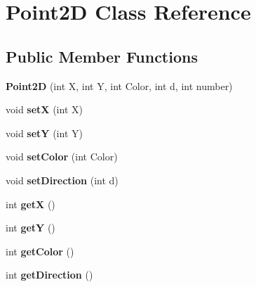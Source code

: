 \hypertarget{class_point2_d}{
\section{Point2D Class Reference}
\label{class_point2_d}
}
\subsection*{Public Member Functions}
\begin{DoxyCompactItemize}
\item 
\hypertarget{class_point2_d_ae02be3bb686d11b9bf6a0efba1ac0025}{
{\bfseries Point2D} (int X, int Y, int Color, int d, int number)}
\label{class_point2_d_ae02be3bb686d11b9bf6a0efba1ac0025}

\item 
\hypertarget{class_point2_d_a1218e9394785d0bcda3bd3823c0eb76e}{
void {\bfseries setX} (int X)}
\label{class_point2_d_a1218e9394785d0bcda3bd3823c0eb76e}

\item 
\hypertarget{class_point2_d_af34e800a83909ebc304c1433d9cf17e6}{
void {\bfseries setY} (int Y)}
\label{class_point2_d_af34e800a83909ebc304c1433d9cf17e6}

\item 
\hypertarget{class_point2_d_ac626261c1faff6d87b3dcfacac8df39e}{
void {\bfseries setColor} (int Color)}
\label{class_point2_d_ac626261c1faff6d87b3dcfacac8df39e}

\item 
\hypertarget{class_point2_d_a0e533717fefd5ee19e24eb8027c6ef00}{
void {\bfseries setDirection} (int d)}
\label{class_point2_d_a0e533717fefd5ee19e24eb8027c6ef00}

\item 
\hypertarget{class_point2_d_a558f484d3feb2432350e3d3149e72e8c}{
int {\bfseries getX} ()}
\label{class_point2_d_a558f484d3feb2432350e3d3149e72e8c}

\item 
\hypertarget{class_point2_d_a86630685042226ef670949d164ced5ca}{
int {\bfseries getY} ()}
\label{class_point2_d_a86630685042226ef670949d164ced5ca}

\item 
\hypertarget{class_point2_d_aa9d9c376b0e577e571a29d0b86201b68}{
int {\bfseries getColor} ()}
\label{class_point2_d_aa9d9c376b0e577e571a29d0b86201b68}

\item 
\hypertarget{class_point2_d_a9ccae45a94532e559e3522b74dfafcd6}{
int {\bfseries getDirection} ()}
\label{class_point2_d_a9ccae45a94532e559e3522b74dfafcd6}

\end{DoxyCompactItemize}
